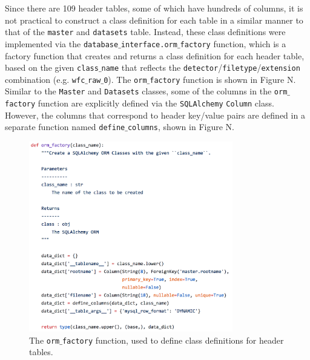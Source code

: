 \documentclass[10pt,journal,compsoc]{IEEEtran}
\begin{document}
Since there are 109 header tables, some of which have hundreds of columns, it is not practical to construct
a class definition for each table in a similar manner to that of the \texttt{master} and \texttt{datasets}
table.  Instead, these class definitions were implemented via the \texttt{database$\_$interface.orm$\_$factory}
function, which is a factory function that creates and returns a class definition for each header table, based on
the given \texttt{class$\_$name} that reflects the \texttt{detector}/\texttt{filetype}/\texttt{extension} combination
(e.g. \texttt{wfc$\_$raw$\_$0}).  The \texttt{orm$\_$factory} function is shown in Figure N.  Similar to the
\texttt{Master} and \texttt{Datasets} classes, some of the columns in the \texttt{orm$\_$factory} function are
explicitly defined via the \texttt{SQLAlchemy} \texttt{Column} class.  However, the columns that correspond to
header key/value pairs are defined in a separate function named \texttt{define$\_$columns}, shown in Figure N.

\begin{figure}[!t]
\centering
\includegraphics[width=3.5in]{./figures/orm_factory.png}
\caption{The \texttt{orm$\_$factory} function, used to define class definitions for header tables.}
\label{fig1}
\end{figure}
\end{document}
